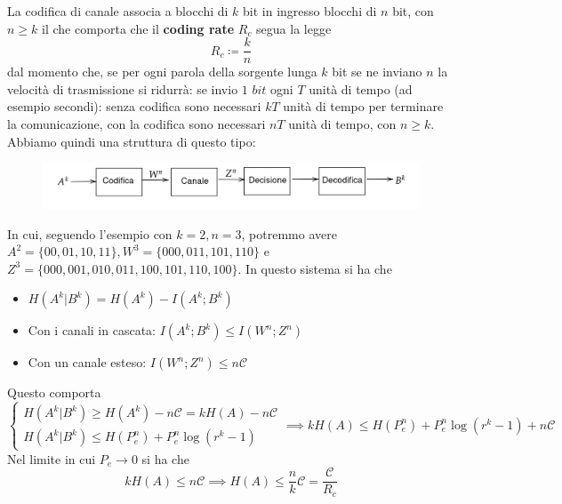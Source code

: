 La codifica di canale associa a blocchi di $k$ bit in ingresso blocchi di $n$ bit, con $n \geq k$ il che comporta che il \textbf{coding rate} $R_c$ segua la legge
\begin{equation}
    R_c \coloneqq \frac{k}{n}
\end{equation}
dal momento che, se per ogni parola della sorgente lunga $k$ bit se ne inviano $n$ la velocità di trasmissione si ridurr\`a: se invio $1$ $bit$ ogni $T$ unit\`a di tempo (ad esempio secondi): senza codifica sono necessari $kT$ unit\`a di tempo per terminare la comunicazione, con la codifica sono necessari $nT$ unit\`a di tempo, con $n\geq k$. Abbiamo quindi una struttura di questo tipo:
\begin{figure}[H]
    \centering
    \includegraphics[scale=0.3]{img/diagramma.png}
\end{figure}
In cui, seguendo l'esempio con $k=2, n=3$, potremmo avere $A^2 = \{00, 01, 10, 11\}, W^3 = \{000, 011, 101, 110\}$ e $Z^3 = \{000, 001, 010, 011, 100, 101, 110, 100\}$. In questo sistema si ha che
\begin{itemize}
    \item $H(A^k|B^k) = H(A^k) - I(A^k;B^k)$
    \item Con i canali in cascata: $I(A^k; B^k) \leq I(W^n;Z^n)$
    \item Con un canale esteso: $I(W^n;Z^n) \leq n \mathcal{C}$
\end{itemize}
Questo comporta
\begin{equation*}
    \begin{cases}
    H(A^k|B^k) \geq H(A^k) - n \mathcal{C} = kH(A) - n \mathcal{C} \\
    H(A^k|B^k) \leq H(P_e^n) + P_e^n \log (r^k - 1)
    \end{cases} \implies k H(A) \leq H(P_e^n) + P_e^n \log (r^k -1) + n \mathcal{C}
\end{equation*}
Nel limite in cui $P_e \to 0$ si ha che 
\begin{equation*}
    kH(A) \leq n \mathcal{C} \implies H(A) \leq \frac{n}{k} \mathcal{C} = \frac{\mathcal{C}}{R_c}
\end{equation*}

